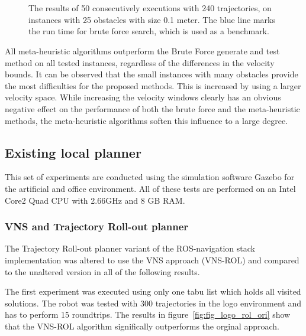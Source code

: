 \begin{figure}[thpb]
   \myfloatalign
    \tiny
          \centering
    \\
    \\
    \caption[Experiment: Small obstacle instances with different velocity bounds]{The results of 50 consecutively executions with 240 trajectories, on instances with 25 obstacles with size 0.1 meter. The blue line marks the run time for brute force search, which is used as a benchmark.}  
     \label{fig:fig_vel_small}
\end{figure}

All meta-heuristic algorithms outperform the Brute Force generate and test method on all tested instances, regardless of the differences in the velocity bounds.
It can be observed that the small instances with many obstacles provide the most difficulties for the proposed methods.
This is increased by using a larger velocity space.
While increasing the velocity windows clearly has an obvious negative effect on the performance of both the brute force and the meta-heuristic methods, the meta-heuristic algorithms soften this influence to a large degree. 

\subsection{Existing local planner}
This set of experiments are conducted using the simulation software Gazebo for the artificial and office environment. 
All of these tests are performed on an Intel Core2 Quad CPU with 2.66GHz and 8 GB RAM.

\subsubsection{VNS and Trajectory Roll-out planner}
The Trajectory Roll-out planner variant of the ROS-navigation stack implementation was altered to use the VNS approach (VNS-ROL) and compared to the unaltered version in all of the following results.

The first experiment was executed using only one tabu list which holds all visited solutions. 
The robot was tested with 300 trajectories in the logo environment and has to perform 15 roundtrips.
The results in figure~\ref{fig:fig_logo_rol_ori} show that the VNS-ROL algorithm significally outperforms the orginal approach. 

